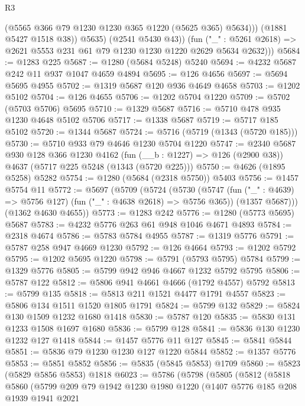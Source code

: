 \begin{lexlean}{R3}
\begin{coremodule}
                  (@5565 @366 @79 @1230 @1230 @365 @1220 (@5625 @365) @5634)))
              (@1881 @5427 @1518 @38))
            @5635)
          (@2541 @5430 @43))
        (fun ("_" : @5261 @2618) => @2621 @5553 @231 @61 @79 @1230 @1230 @1220 @2629 @5634 @2632)))
@5684 := @1283 @225
@5687 := @1280 (@5684 @5248) @5240
@5694 := @4232 @5687 @242 @11 @937 @1047 @4659 @4894
@5695 := @126 @4656
@5697 := @5694 @5695 @4955
@5702 := @1319 @5687 @120 @936 @4649 @4658
@5703 := @1202 @5102
@5704 := @126 @4655
@5706 := @1202 @5704 @1220
@5709 := @5702 (@5703 @5706) @5695
@5710 := @1329 @5687
@5716 := @5710 @478 @935 @1230 @4648 @5102 @5706
@5717 := @1338 @5687
@5719 := @5717 @185 @5102
@5720 := @1344 @5687
@5724 := @5716 (@5719 (@1343 (@5720 @185)))
@5730 := @5710 @933 @79 @4646 @1230 @5704 @1220
@5747 := @2340
    @5687
    @930
    @128
    @366
    @1230
    @4162
    (fun (__b : @1227) => @126 (@2900 @38))
    @4637
    (@5717 @225 @5248 (@1343 (@5720 @225)))
@5750 := @4626 (@1895 @5258) @5282
@5754 := @1280 (@5684 (@2318 @5750)) @5403
@5756 := @1457 @5754 @11
@5772 := @5697
    (@5709
      (@5724
        (@5730
          (@5747 (fun ("_" : @4639) => @5756 @127) (fun ("_" : @4638 @2618) => @5756 @365))
          (@1357 @5687)))
      (@1362 @4630 @4655))
@5773 := @1283 @242
@5776 := @1280 (@5773 @5695) @5687
@5783 := @4232 @5776 @263 @61 @948 @1046 @4671 @4893
@5784 := @2318 @4674
@5786 := @5783 @5784 @4955
@5787 := @1319 @5776
@5791 := @5787 @258 @947 @4669 @1230
@5792 := @126 @4664
@5793 := @1202 @5792
@5795 := @1202 @5695 @1220
@5798 := @5791 (@5793 @5795) @5784
@5799 := @1329 @5776
@5805 := @5799 @942 @946 @4667 @1232 @5792 @5795
@5806 := @5787 @122
@5812 := @5806 @941 @4661 @4666 (@1792 @4557) @5792
@5813 := @5799 @135
@5818 := @5813 @211 @1521 @4477 @1791 @4557
@5823 := @5806 @134 @1511 @1520 @1805 @1791
@5824 := @5799 @132
@5829 := @5824 @130 @1509 @1232 @1680 @1418
@5830 := @5787 @120
@5835 := @5830 @131 @1233 @1508 @1697 @1680
@5836 := @5799 @128
@5841 := @5836 @130 @1230 @1232 @127 @1418
@5844 := @1457 @5776 @11 @127
@5845 := @5841 @5844
@5851 := @5836 @79 @1230 @1230 @127 @1220 @5844
@5852 := @1357 @5776
@5853 := @5851 @5852
@5856 := @5835 (@5845 @5853) @1709
@5860 := @5823 (@5829 @5856 @5853) @1818
@6023 := @5786
    (@5798
      (@5805
        (@5812
          (@5818
            @5860
            (@5799
              @209
              @79
              @1942
              @1230
              @1980
              @1220
              (@1407
                @5776
                @185
                @208
                @1939
                @1941
                @2021

\end{coremodule}
\end{lexlean}
